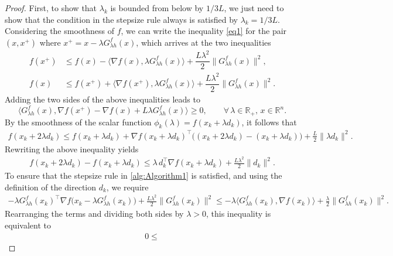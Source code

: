 \documentclass[11pt, a4paper, oneside, reqno]{amsart}
\begin{document}
\begin{proof}
First, to show that $\lambda_k$ is bounded from below by ${1}/{3L}$, we just need to show that the condition in the stepsize rule always is satisfied by $\lambda_k = 1/{3L}$. Considering the smoothness of $f$, we can write the inequality \eqref{eq1} for the pair $(x,x^+)$ where $x^+ = x - \lambda G^{f}_{\lambda h}(x)$, which arrives at the two inequalities
\begin{align*}
f(x^+) &\leq f(x) - \langle \nabla f(x),\lambda G^{f}_{\lambda h}(x) \rangle + \dfrac{L\lambda ^2}{2} \|G^{f}_{\lambda h}(x)\|^2, \\
f(x) &\leq f(x^+) + \langle \nabla f(x^+),\lambda G^{f}_{\lambda h}(x) \rangle + \dfrac{L\lambda ^2}{2} \|G^{f}_{\lambda h}(x)\|^2.
\end{align*}
Adding the two sides of the above inequalities leads to
\begin{equation}\label{eq4}
\langle G^{f}_{\lambda h}(x), \nabla f(x^+) - \nabla f(x) + {L\lambda}G^{f}_{\lambda h}(x) \rangle \geq 0, \qquad \forall \, \lambda \in \mathbb{R}_+, \, x \in \mathbb{R}^n.   
\end{equation}
{By the smoothness of the scalar function $\phi_k(\lambda) = f(x_k + \lambda d_k)$, it follows that
\begin{align*}
    f(x_k + 2\lambda d_k)
    \leq f(x_k + \lambda d_k)
    + \nabla f(x_k + \lambda d_k)^\top \bigl( (x_k + 2\lambda d_k) - (x_k + \lambda d_k) \bigr)
    + \frac{L}{2}\|\lambda d_k\|^2.
\end{align*}
Rewriting the above inequality yields
\begin{align*}
    f(x_k + 2\lambda d_k) - f(x_k + \lambda d_k)
    \leq \lambda\, d_k^\top \nabla f(x_k + \lambda d_k)
    + \frac{L\lambda^2}{2}\|d_k\|^2.
\end{align*}
To ensure that the stepsize rule in \ref{alg:Algorithm1} is satisfied, and using the definition of the direction $d_k$, we require
{\color{black}
\begin{align*}
    - \lambda G^{f}_{\lambda h}(x_k)^\top
    \nabla f\bigl(x_k - \lambda G^{f}_{\lambda h}(x_k)\bigr)
    + \frac{L\lambda^2}{2}\|G^{f}_{\lambda h}(x_k)\|^2
    \leq
    - \lambda \langle G^{f}_{\lambda h}(x_k), \nabla f(x_k) \rangle
    + \frac{\lambda}{2}\|G^{f}_{\lambda h}(x_k)\|^2.
\end{align*}
Rearranging the terms and dividing both sides by $\lambda>0$, this inequality is equivalent to}
\begin{align}\label{thr2_3_ineq1}
    0 \leq

\end{align}}
\end{proof}
\end{document}
